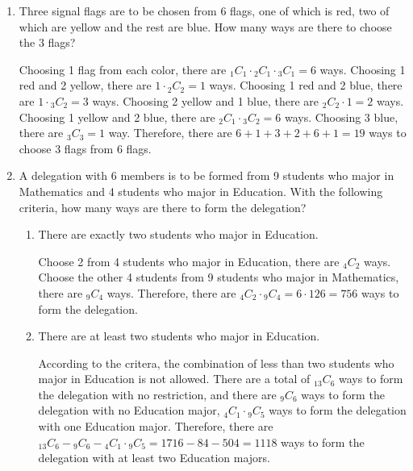 \documentclass{report}
\newcommand\comb[2][^n]{{}_{#1}C_{#2}}
\begin{document}
\begin{multicols}{2}
\begin{enumerate}
    \item Three signal flags are to be chosen from 6 flags, one of which is red, two of
          which are yellow and the rest are blue. How many ways are there to choose the 3
          flags? \sol{}

          Choosing 1 flag from each color, there are $\comb[1]{1} \cdot \comb[2]{1} \cdot
            \comb[3]{1} = 6$ ways. Choosing 1 red and 2 yellow, there are $1 \cdot
            \comb[2]{2} = 1$ ways. Choosing 1 red and 2 blue, there are $1 \cdot
            \comb[3]{2} = 3$ ways. Choosing 2 yellow and 1 blue, there are $\comb[2]{2}
            \cdot 1 = 2$ ways. Choosing 1 yellow and 2 blue, there are $\comb[2]{1} \cdot
            \comb[3]{2} = 6$ ways. Choosing 3 blue, there are $\comb[3]{3} = 1$ way.
          Therefore, there are $6 + 1 + 3 + 2 + 6 + 1 = 19$ ways to choose 3 flags from 6
          flags.

    \item A delegation with 6 members is to be formed from 9 students who major in
          Mathematics and 4 students who major in Education. With the following criteria,
          how many ways are there to form the delegation?
          \begin{enumerate}
            \item There are exactly two students who major in Education. \sol{}

                  Choose 2 from 4 students who major in Education, there are $\comb[4]{2}$ ways.
                  Choose the other 4 students from 9 students who major in Mathematics, there are
                  $\comb[9]{4}$ ways. Therefore, there are $\comb[4]{2} \cdot \comb[9]{4} = 6
                    \cdot 126 = 756$ ways to form the delegation.

            \item There are at least two students who major in Education. \sol{}

                  According to the critera, the combination of less than two students who major
                  in Education is not allowed. There are a total of $\comb[13]{6}$ ways to form
                  the delegation with no restriction, and there are $\comb[9]{6}$ ways to form
                  the delegation with no Education major, $\comb[4]{1} \cdot \comb[9]{5}$ ways to
                  form the delegation with one Education major. Therefore, there are
                  $\comb[13]{6} - \comb[9]{6} - \comb[4]{1} \cdot \comb[9]{5} = 1716 - 84 - 504 =
                    1118$ ways to form the delegation with at least two Education majors.


\end{enumerate}
\end{enumerate}
\end{multicols}
\end{document}
